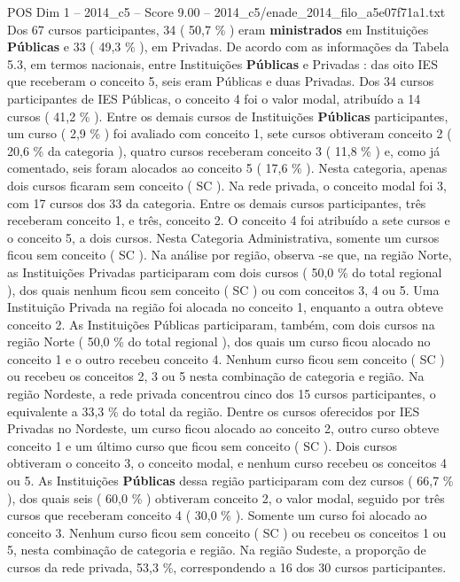 \begin{textsample}{POS Dim 1 – 2014\_c5 – Score 9.00 – 2014\_c5/enade\_2014\_filo\_a5e07f71a1.txt}
Dos 67 cursos participantes, 34 ( 50,7 \% ) eram \textbf{ministrados} em Instituições \textbf{Públicas} e 33 ( 49,3 \% ), em Privadas.
De acordo com as informações da Tabela 5.3, em termos nacionais, entre Instituições \textbf{Públicas} e Privadas : das oito IES que receberam o conceito 5, seis eram Públicas e duas Privadas.
Dos 34 cursos participantes de IES Públicas, o conceito 4 foi o valor modal, atribuído a 14 cursos ( 41,2 \% ).
Entre os demais cursos de Instituições \textbf{Públicas} participantes, um curso ( 2,9 \% ) foi avaliado com conceito 1, sete cursos obtiveram conceito 2 ( 20,6 \% da categoria ), quatro cursos receberam conceito 3 ( 11,8 \% ) e, como já comentado, seis foram alocados ao conceito 5 ( 17,6 \% ).
Nesta categoria, apenas dois cursos ficaram sem conceito ( SC ).
Na rede privada, o conceito modal foi 3, com 17 cursos dos 33 da categoria.
Entre os demais cursos participantes, três receberam conceito 1, e três, conceito 2.
O conceito 4 foi atribuído a sete cursos e o conceito 5, a dois cursos.
Nesta Categoria Administrativa, somente um cursos ficou sem conceito ( SC ).
Na análise por região, observa -se que, na região Norte, as Instituições Privadas participaram com dois cursos ( 50,0 \% do total regional ), dos quais nenhum ficou sem conceito ( SC ) ou com conceitos 3, 4 ou 5.
Uma Instituição Privada na região foi alocada no conceito 1, enquanto a outra obteve conceito 2.
As Instituições Públicas participaram, também, com dois cursos na região Norte ( 50,0 \% do total regional ), dos quais um curso ficou alocado no conceito 1 e o outro recebeu conceito 4.
Nenhum curso ficou sem conceito ( SC ) ou recebeu os conceitos 2, 3 ou 5 nesta combinação de categoria e região.
Na região Nordeste, a rede privada concentrou cinco dos 15 cursos participantes, o equivalente a 33,3 \% do total da região.
Dentre os cursos oferecidos por IES Privadas no Nordeste, um curso ficou alocado ao conceito 2, outro curso obteve conceito 1 e um último curso que ficou sem conceito ( SC ).
Dois cursos obtiveram o conceito 3, o conceito modal, e nenhum curso recebeu os conceitos 4 ou 5.
As Instituições \textbf{Públicas} dessa região participaram com dez cursos ( 66,7 \% ), dos quais seis ( 60,0 \% ) obtiveram conceito 2, o valor modal, seguido por três cursos que receberam conceito 4 ( 30,0 \% ).
Somente um curso foi alocado ao conceito 3.
Nenhum curso ficou sem conceito ( SC ) ou recebeu os conceitos 1 ou 5, nesta combinação de categoria e região.
Na região Sudeste, a proporção de cursos da rede privada, 53,3 \%, correspondendo a 16 dos 30 cursos participantes.

\end{textsample}
